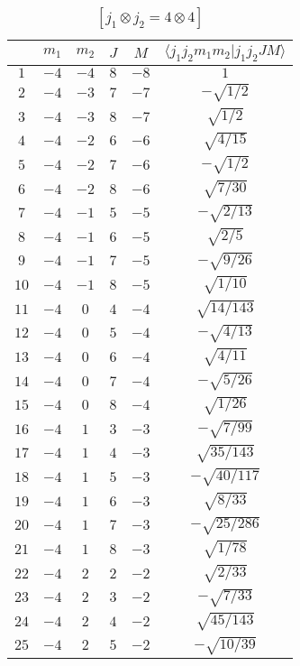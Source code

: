 \begin{table}
\tiny
\caption{$[j_1 \otimes j_2 = 4 \otimes 4]$}
\begin{center}
\begin{tabular}{|c|c|c|c|c|c|}
\hline 
   & $m_1$ & $m_2$ & $J$ & $M$ & $\langle j_1 j_2 m_1 m_2 | j_1 j_2 J M \rangle$ \\ 
\hline 
$1$ & $-4$ & $-4$ & $8$ & $-8$ & $1$ \\ 
$2$ & $-4$ & $-3$ & $7$ & $-7$ & $-\sqrt{1/2}$ \\ 
$3$ & $-4$ & $-3$ & $8$ & $-7$ & $\sqrt{1/2}$ \\ 
$4$ & $-4$ & $-2$ & $6$ & $-6$ & $\sqrt{4/15}$ \\ 
$5$ & $-4$ & $-2$ & $7$ & $-6$ & $-\sqrt{1/2}$ \\ 
$6$ & $-4$ & $-2$ & $8$ & $-6$ & $\sqrt{7/30}$ \\ 
$7$ & $-4$ & $-1$ & $5$ & $-5$ & $-\sqrt{2/13}$ \\ 
$8$ & $-4$ & $-1$ & $6$ & $-5$ & $\sqrt{2/5}$ \\ 
$9$ & $-4$ & $-1$ & $7$ & $-5$ & $-\sqrt{9/26}$ \\ 
$10$ & $-4$ & $-1$ & $8$ & $-5$ & $\sqrt{1/10}$ \\ 
$11$ & $-4$ & $0$ & $4$ & $-4$ & $\sqrt{14/143}$ \\ 
$12$ & $-4$ & $0$ & $5$ & $-4$ & $-\sqrt{4/13}$ \\ 
$13$ & $-4$ & $0$ & $6$ & $-4$ & $\sqrt{4/11}$ \\ 
$14$ & $-4$ & $0$ & $7$ & $-4$ & $-\sqrt{5/26}$ \\ 
$15$ & $-4$ & $0$ & $8$ & $-4$ & $\sqrt{1/26}$ \\ 
$16$ & $-4$ & $1$ & $3$ & $-3$ & $-\sqrt{7/99}$ \\ 
$17$ & $-4$ & $1$ & $4$ & $-3$ & $\sqrt{35/143}$ \\ 
$18$ & $-4$ & $1$ & $5$ & $-3$ & $-\sqrt{40/117}$ \\ 
$19$ & $-4$ & $1$ & $6$ & $-3$ & $\sqrt{8/33}$ \\ 
$20$ & $-4$ & $1$ & $7$ & $-3$ & $-\sqrt{25/286}$ \\ 
$21$ & $-4$ & $1$ & $8$ & $-3$ & $\sqrt{1/78}$ \\ 
$22$ & $-4$ & $2$ & $2$ & $-2$ & $\sqrt{2/33}$ \\ 
$23$ & $-4$ & $2$ & $3$ & $-2$ & $-\sqrt{7/33}$ \\ 
$24$ & $-4$ & $2$ & $4$ & $-2$ & $\sqrt{45/143}$ \\ 
$25$ & $-4$ & $2$ & $5$ & $-2$ & $-\sqrt{10/39}$ \\ 

\end{tabular}
\end{center}
\end{table}
